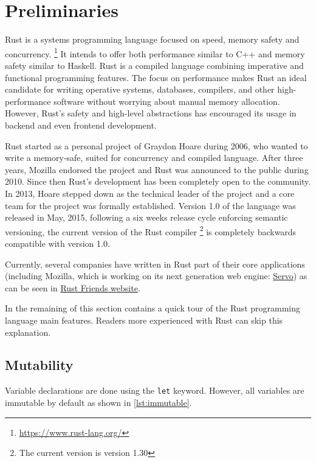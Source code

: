 \chapter{Preliminaries}
\label{chapter:preliminaries}

Rust is a systems programming language focused on speed, memory safety and concurrency. \footnote{\url{https://www.rust-lang.org/}}  It intends to offer both performance similar to C++ and memory safety similar to Haskell. Rust is a compiled language combining imperative and functional programming features. The focus on performance makes Rust an ideal candidate for writing operative systems, databases, compilers, and other high-performance software without worrying about manual memory allocation. However, Rust's safety and high-level abstractions has encouraged its usage in backend and even frontend development. 

Rust started as a personal project of Graydon Hoare during 2006, who wanted to write a memory-safe, suited for concurrency and compiled language. After three years, Mozilla endorsed the project and Rust was announced to the public during 2010. Since then Rust's development has been completely open to the community. In 2013, Hoare stepped down as the technical leader of the project and a core team for the project was formally established. \cite{steve_acm} Version 1.0 of the language was released in May, 2015, following a six weeks release cycle enforcing semantic versioning, the current version of the Rust compiler \footnote{The current version is version 1.30} is completely backwards compatible with version 1.0.

Currently, several companies have written in Rust part of their core applications (including Mozilla, which is working on its next generation web engine: \href{https://servo.org/}{Servo}) as can be seen in \href{https://www.rust-lang.org/en-US/friends.html}{Rust Friends website}.

In the remaining of this section contains a quick tour of the Rust programming language main features. Readers more experienced with Rust can skip this explanation.

\section{Mutability}
Variable declarations are done using the \texttt{let} keyword. However, all variables are immutable by default as shown in \ref{lst:immutable}.

